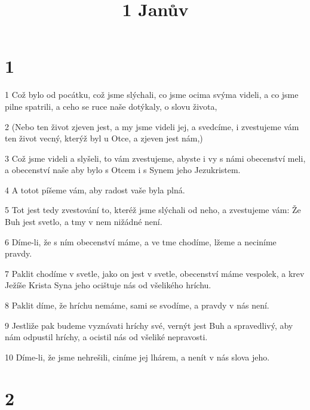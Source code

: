 

\title{1 Janův}

\chapter{1}

\par 1 Což bylo od pocátku, což jsme slýchali, co jsme ocima svýma videli, a co jsme pilne spatrili, a ceho se ruce naše dotýkaly, o slovu života,
\par 2 (Nebo ten život zjeven jest, a my jsme videli jej, a svedcíme, i zvestujeme vám ten život vecný, kterýž byl u Otce, a zjeven jest nám,)
\par 3 Což jsme videli a slyšeli, to vám zvestujeme, abyste i vy s námi obecenství meli, a obecenství naše aby bylo s Otcem i s Synem jeho Jezukristem.
\par 4 A totot píšeme vám, aby radost vaše byla plná.
\par 5 Tot jest tedy zvestování to, kteréž jsme slýchali od neho, a zvestujeme vám: Že Buh jest svetlo, a tmy v nem nižádné není.
\par 6 Díme-li, že s ním obecenství máme, a ve tme chodíme, lžeme a neciníme pravdy.
\par 7 Paklit chodíme v svetle, jako on jest v svetle, obecenství máme vespolek, a krev Ježíše Krista Syna jeho ocištuje nás od všelikého hríchu.
\par 8 Paklit díme, že hríchu nemáme, sami se svodíme, a pravdy v nás není.
\par 9 Jestliže pak budeme vyznávati hríchy své, vernýt jest Buh a spravedlivý, aby nám odpustil hríchy, a ocistil nás od všeliké nepravosti.
\par 10 Díme-li, že jsme nehrešili, ciníme jej lhárem, a nenít v nás slova jeho.

\chapter{2}

